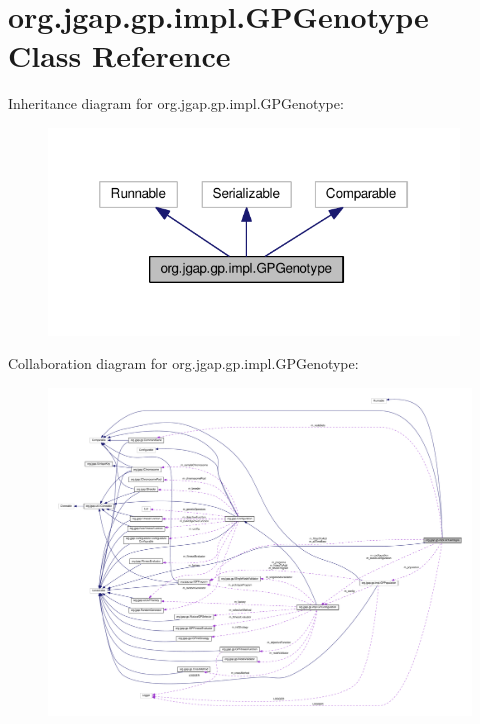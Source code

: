 \hypertarget{classorg_1_1jgap_1_1gp_1_1impl_1_1_g_p_genotype}{\section{org.\-jgap.\-gp.\-impl.\-G\-P\-Genotype Class Reference}
\label{classorg_1_1jgap_1_1gp_1_1impl_1_1_g_p_genotype}
}


Inheritance diagram for org.\-jgap.\-gp.\-impl.\-G\-P\-Genotype\-:
\nopagebreak
\begin{figure}[H]
\begin{center}
\leavevmode
\includegraphics[width=309pt]{classorg_1_1jgap_1_1gp_1_1impl_1_1_g_p_genotype__inherit__graph}
\end{center}
\end{figure}


Collaboration diagram for org.\-jgap.\-gp.\-impl.\-G\-P\-Genotype\-:
\nopagebreak
\begin{figure}[H]
\begin{center}
\leavevmode
\includegraphics[width=350pt]{classorg_1_1jgap_1_1gp_1_1impl_1_1_g_p_genotype__coll__graph}
\end{center}
\end{figure}
